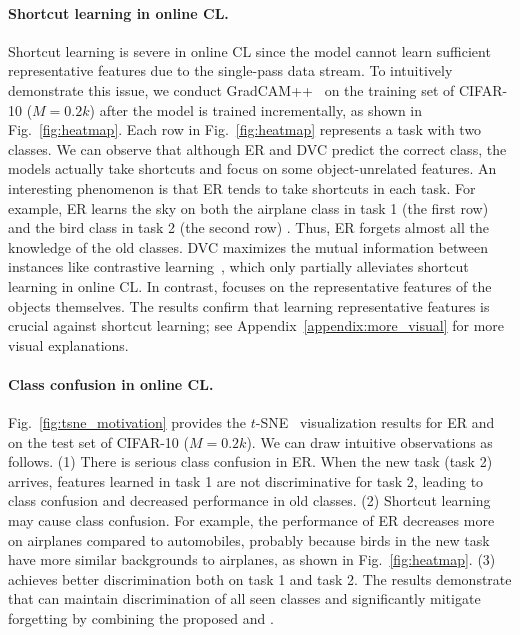 \paragraph{Shortcut learning in online CL.}
Shortcut learning is severe in online CL since the model cannot learn sufficient representative features due to the single-pass data stream. To intuitively demonstrate this issue,  
we conduct GradCAM++~\cite{Grad-cam++} on the training set of CIFAR-10 ($M=0.2k$) after the model is trained incrementally, as shown in Fig.~\ref{fig:heatmap}.
Each row in Fig.~\ref{fig:heatmap} represents a task with two classes.
We can observe that although ER and DVC predict the correct class, the models actually take shortcuts and focus on some object-unrelated features. 
An interesting phenomenon is that ER tends to take shortcuts in each task. For example, ER learns the sky on both the airplane class in task 1 (the first row) and the bird class in task 2 (the second row) . Thus, ER forgets almost all the knowledge of the old classes.  
DVC maximizes the mutual information between instances like contrastive learning~\cite{SimCLR, MoCo}, which only partially alleviates shortcut learning in online CL. 
In contrast, \frameworkName focuses on the representative features of the objects themselves. The results confirm that learning representative features is crucial against shortcut learning; see Appendix~\ref{appendix:more_visual} for more visual explanations.






\paragraph{Class confusion in online CL.}
Fig.~\ref{fig:tsne_motivation} provides the $t$-SNE~\cite{tsne} visualization results for ER and \frameworkName on the test set of CIFAR-10 ($M=0.2k$). 
We can draw intuitive observations as follows. 
(1) There is serious class confusion in ER.
When the new task (task 2) arrives, features learned in task 1 are not discriminative for task 2, leading to class confusion and decreased performance in old classes.
(2) Shortcut learning may cause class confusion. For example, the performance of ER decreases more on airplanes compared to automobiles, probably because birds in the new task have more similar backgrounds to airplanes, as shown in Fig.~\ref{fig:heatmap}.
(3) \frameworkName achieves better discrimination both on task 1 and task 2. The results demonstrate that \frameworkName can maintain discrimination of all seen classes and significantly mitigate forgetting by 
combining the proposed \methodname and \dataaugname.







